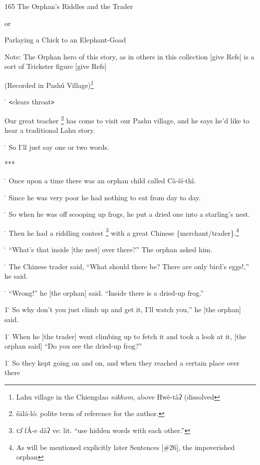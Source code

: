 
165 The Orphan's Riddles and the Trader

or

Parlaying a Chick to an Elephant-Goad

Note: The Orphan hero of this story, as in others in this collection [give Refs]
is a sort of Trickster figure [give Refs]

(Recorded in Pashú Village)\footnote{Lahu village in the Chiengdao \textit{nikhom}, above Hwè-tàʔ (dissolved}

\. \texttt{<}clears throat\texttt{>}

Our great teacher \footnote{šālā-ló: polite term of reference for the author.} has come to visit our Pashu village, and he says he'd like
to hear a traditional Lahu story.

\. So I'll just say one or two words.

***

\. Once upon a time there was an orphan child called Cà-ší-thî.

\. Since he was very poor he had nothing to eat from day to day.

\. So when he was off scooping up frogs, he put a dried one into a starling's nest.

\. Then he had a riddling contest \footnote{tɔ̂ fÁ-e dàʔ ve: lit. ``use hidden words with each other.''} with a great Chinese \{merchant/trader\}.\footnote{As will be mentioned explicitly later Sentences [\#26], the impoverished orphan}

\. ``What's that inside [the nest] over there?'' The orphan asked him.

\. The Chinese trader said, ``What should there be? There are only bird's eggs!,''
he said.

\. ``Wrong!'' he [the orphan] said. ``Inside there is a dried-up frog.''

1\. So why don't you just climb up and get it, I'll watch you,'' he [the orphan]
said.

1\. When he [the trader] went climbing up to fetch it and took a look at it, [the
orphan said] ``Do you see the dried-up frog?''

1\. So they kept going on and on, and when they reached a certain place over there
